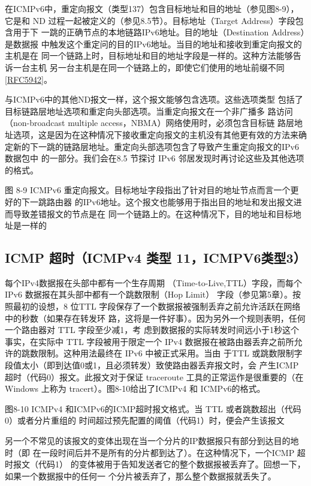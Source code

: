 在ICMPv6中，重定向报文（类型137）包含目标地址和目的地址（参见图8-9），它是和
ND 过程一起被定义的（参见8.5节）。目标地址（Target Address）字段包含用于下
一跳的正确节点的本地链路IPv6地址。目的地址（Destination Address）是数据报
中触发这个重定问的目的IPv6地址。当目的地址和接收到重定向报文的主机是在
同一个链路上时，目标地址和目的地址字段是一样的。这种方法能够告诉一台主机
另一台主机是在同一个链路上的，即使它们使用的地址前缀不同\href{https://www.rfc-editor.org/rfc/rfc5942}{[RFC5942]}。

与ICMPv6中的其他ND报文一样，这个报文能够包含选项。这些选项类型
包括了目标链路层地址选项和重定向头部选项。当重定向报文在一个非广播多
路访问 （non-broadcast multiple access，NBMA）网络使用时，必须包含目标链
路层地址选项，这是因为在这种情况下接收重定向报文的主机没有其他更有效的方法来确
定新的下一跳的链路层地址。重定向头部选项包含了导致产生重定向报文的IPv6数据包中
的一部分。我们会在8.5 节探讨 IPv6 邻居发现时再讨论这些及其他选项的格式。

图 8-9	ICMPv6 重定向报文。目标地址字段指出了针对目的地址节点而言一个更好的下一跳路由器
的IPv6地址。这个报文也能够用于指出目的地址和发出报文进而导致差错报文的节点是在
同一个链路上的。在这种情况下，目的地址和目标地址是一样的

\subsection{ICMP 超时（ICMPv4 类型 11，ICMPV6类型3）}
每个IPv4数据报在头部中都有一个生存周期 （Time-to-Live,TTL）字段，而每个IPv6
数据报在其头部中都有一个跳数限制（Hop Limit） 字段（参见第5章）。按照最初的设想，8
位TTL 字段保存了一个数据报被强制丢弃之前允许活跃在网络中的秒数（如果存在转发环
路，这将是一件好事）。因为另外一个规则表明，任何一个路由器对 TTL 字段至少减1，考
虑到数据报的实际转发时间远小于1秒这个事实，在实际中 TTL 字段被用于限定一个 IPv4
数据报在被路由器丢弃之前所允许的跳数限制。这种用法最终在 IPv6 中被正式采用。当由
于TTL 或跳数限制字段值太小（即到达值0或1，且必须转发）致使路由器丢弃报文时，会
产生ICMP超时（代码0）报文。此报文对于保证 traceroute 工具的正常运作是很重要的（在
Windows 上称为 tracert）。图8-10给出了ICMPv4 和 ICMPv6的格式。


图8-10	ICMPv4 和ICMPv6的ICMP超时报文格式。当 TTL 或者跳数超出（代码0）或者分片重组的
时间超过预先配置的阈值（代码1）时，便会产生该报文

另一个不常见的该报文的变体出现在当一个分片的IP数据报只有部分到达目的地时（即
在一段时间后并不是所有的分片都到达了）。在这种情况下，一个ICMP 超时报文（代码1）
的变体被用于告知发送者它的整个数据报被丢弃了。回想一下，如果一个数据报中的任何一
个分片被丢弃了，那么整个数据报就丢失了。

